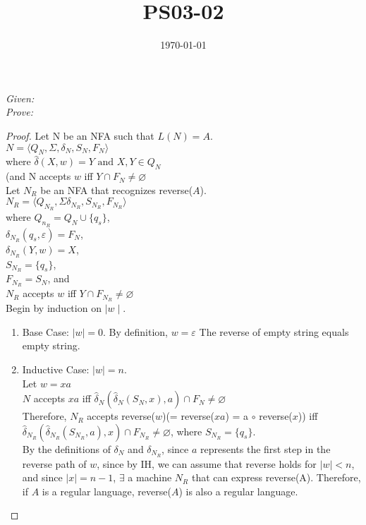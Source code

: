 \documentclass{article}
\title{PS03-02}
\date{\today}
\begin{document}
\maketitle
\noindent\textit{Given: }\\ 
\textit{Prove: }\\
\begin{proof}
	Let N be an NFA such that $L(N) = A$.\\
	$N = \langle Q_N, \Sigma, \delta_N, S_N, F_N \rangle$\\
	where $\hat{\delta}(X, w) = Y \text{ and } X,Y \in Q_N$\\
	(and N accepts $w$ iff $Y \cap F_N \neq \varnothing$\\
	
	\noindent Let $N_R$ be an NFA that recognizes reverse($A$).\\
	$N_R = \langle Q_{N_R}, \Sigma \delta_{N_R}, S_{N_R}, F_{N_R} \rangle$\\
	where $Q_{n_R} = Q_N \cup \{q_s\}$,\\
	$\delta_{N_R}(q_s, \varepsilon) = F_N$,\\
	$\delta_{N_R}(Y, w) = X$,\\
	$S_{N_R} = \{q_s\}$,\\
	$F_{N_R} = S_N$, and\\
	$N_R$ accepts $w$ iff $Y \cap F_{N_R} \neq \varnothing$\\

	\noindent Begin by induction on $\mid w \mid$.\\
	\begin{enumerate}[label=\roman*.]
		\item Base Case: $\mid w \mid = 0$. By definition, $w = \varepsilon$
		The reverse of empty string equals empty string.
		\item Inductive Case: $\mid w \mid = n$.\\
		Let $w = xa$\\
		$N$ accepts $xa$ iff $\hat{\delta}_N(\hat{\delta}_N(S_N, x), a) \cap F_N \neq \varnothing$\\
		Therefore, $N_R$ accepts reverse($w$)\big(= reverse($xa$) = a $\circ$ reverse($x$)\big) iff\\
		$\hat{\delta}_{N_R}(\hat{\delta}_{N_R}(S_{N_R}, a), x) \cap F_{N_R} \neq \varnothing$, where $S_{N_R} = \{q_s\}$.\\
			By the definitions of $\delta_N$ and $\delta_{N_R}$, since $a$ represents the first step in the reverse path of $w$, since by IH, we can assume that reverse holds for $\mid w \mid < n$, and since $\mid x\mid = n-1$, $\exists$ a machine $N_R$ that can express reverse(A). Therefore, if $A$ is a regular language, reverse($A$) is also a regular language.
	\end{enumerate}
\end{proof}
\end{document}
